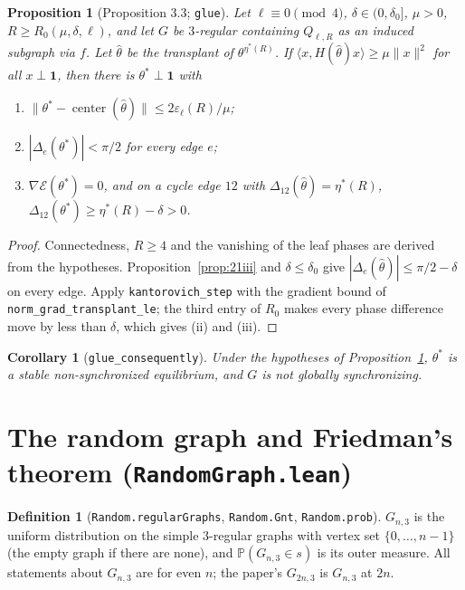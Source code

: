 \documentclass[11pt]{amsart}
\newcommand{\leanname}[1]{\texttt{\textcolor{black!75}{#1}}}
\newcommand{\lfile}[1]{\texttt{#1}}
\newcommand{\E}{\mathcal{E}}
\newcommand{\PP}{\mathbb{P}}
\newcommand{\one}{\mathbf{1}}
\newcommand{\Q}{Q_{\ell,R}}
\newcommand{\Gnt}{G_{n,3}}
\theoremstyle{plain}
\newtheorem{proposition}[theorem]{Proposition}
\newtheorem{corollary}[theorem]{Corollary}
\theoremstyle{definition}
\newtheorem{definition}[theorem]{Definition}
\theoremstyle{remark}
\begin{document}
\begin{proposition}[Proposition 3.3; \leanname{glue}]\label{prop:glue}
Let $\ell\equiv0\pmod4$, $\delta\in(0,\delta_0]$, $\mu>0$, $R\ge R_0(\mu,\delta,\ell)$, and let $G$ be
$3$-regular containing $\Q$ as an induced subgraph via $f$. Let $\hat\theta$ be the transplant of
$\theta^{\eta^*(R)}$. If $\langle x,H(\hat\theta)x\rangle\ge\mu\|x\|^2$ for all $x\perp\one$, then
there is $\theta^*\perp\one$ with
\begin{enumerate}
\item[(i)] $\|\theta^*-\operatorname{center}(\hat\theta)\|\le2\varepsilon_\ell(R)/\mu$;
\item[(ii)] $|\Delta_e(\theta^*)|<\pi/2$ for every edge $e$;
\item[(iii)] $\nabla\E(\theta^*)=0$, and on a cycle edge $12$ with $\Delta_{12}(\hat\theta)=\eta^*(R)$,
  $\Delta_{12}(\theta^*)\ge\eta^*(R)-\delta>0$.
\end{enumerate}
\end{proposition}
\begin{proof}
Connectedness, $R\ge4$ and the vanishing of the leaf phases are derived from the hypotheses.
Proposition~\ref{prop:21iii} and $\delta\le\delta_0$ give $|\Delta_e(\hat\theta)|\le\pi/2-\delta$
on every edge. Apply \leanname{kantorovich\_step} with the gradient bound of
\leanname{norm\_grad\_transplant\_le}; the third entry of $R_0$ makes every phase difference move
by less than $\delta$, which gives (ii) and (iii).
\end{proof}

\begin{corollary}[\leanname{glue\_consequently}]
Under the hypotheses of Proposition~\ref{prop:glue}, $\theta^*$ is a stable non-synchronized
equilibrium, and $G$ is not globally synchronizing.
\end{corollary}

\section{The random graph and Friedman's theorem (\lfile{RandomGraph.lean})}

\begin{definition}[\leanname{Random.regularGraphs}, \leanname{Random.Gnt}, \leanname{Random.prob}]
$\Gnt$ is the uniform distribution on the simple $3$-regular graphs with vertex set
$\{0,\dots,n-1\}$ (the empty graph if there are none), and $\PP(\Gnt\in s)$ is its outer
measure. All statements about $\Gnt$ are for even $n$; the paper's $G_{2n,3}$ is $\Gnt$ at $2n$.
\end{definition}
\end{document}
